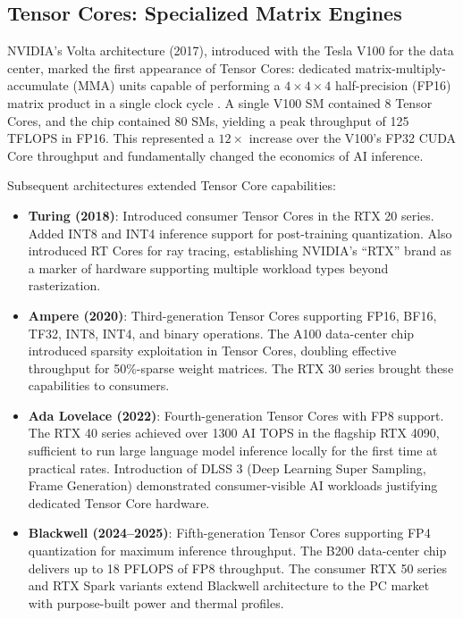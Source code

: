 \documentclass[conference]{IEEEtran}
\begin{document}
\subsection{Tensor Cores: Specialized Matrix Engines}

NVIDIA's Volta architecture (2017), introduced with the Tesla V100 for the data center, marked the first appearance of Tensor Cores: dedicated matrix-multiply-accumulate (MMA) units capable of performing a $4 \times 4 \times 4$ half-precision (FP16) matrix product in a single clock cycle \cite{nvidia2017volta}. A single V100 SM contained 8 Tensor Cores, and the chip contained 80 SMs, yielding a peak throughput of 125 TFLOPS in FP16. This represented a $12\times$ increase over the V100's FP32 CUDA Core throughput and fundamentally changed the economics of AI inference.

Subsequent architectures extended Tensor Core capabilities:

\begin{itemize}
    \item \textbf{Turing (2018)}: Introduced consumer Tensor Cores in the RTX 20 series. Added INT8 and INT4 inference support for post-training quantization. Also introduced RT Cores for ray tracing, establishing NVIDIA's ``RTX'' brand as a marker of hardware supporting multiple workload types beyond rasterization.
    \item \textbf{Ampere (2020)}: Third-generation Tensor Cores supporting FP16, BF16, TF32, INT8, INT4, and binary operations. The A100 data-center chip introduced sparsity exploitation in Tensor Cores, doubling effective throughput for 50\%-sparse weight matrices. The RTX 30 series brought these capabilities to consumers.
    \item \textbf{Ada Lovelace (2022)}: Fourth-generation Tensor Cores with FP8 support. The RTX 40 series achieved over 1300 AI TOPS in the flagship RTX 4090, sufficient to run large language model inference locally for the first time at practical rates. Introduction of DLSS 3 (Deep Learning Super Sampling, Frame Generation) demonstrated consumer-visible AI workloads justifying dedicated Tensor Core hardware.
    \item \textbf{Blackwell (2024--2025)}: Fifth-generation Tensor Cores supporting FP4 quantization for maximum inference throughput. The B200 data-center chip delivers up to 18 PFLOPS of FP8 throughput. The consumer RTX 50 series and RTX Spark variants extend Blackwell architecture to the PC market with purpose-built power and thermal profiles.
\end{itemize}
\end{document}
